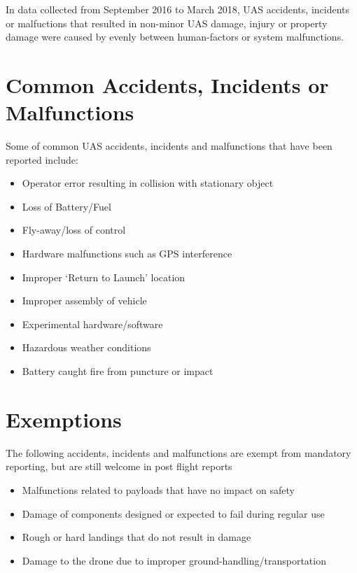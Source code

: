 \documentclass[
]{book}
\providecommand{\tightlist}{%
  \setlength{\itemsep}{0pt}\setlength{\parskip}{0pt}}
\begin{document}
In data collected from September 2016 to March 2018, UAS accidents, incidents or malfuctions that resulted in non-minor UAS damage, injury or property damage were caused by evenly between human-factors or system malfunctions.

\hypertarget{s-common-accidents}{%
\section{Common Accidents, Incidents or Malfunctions}\label{s-common-accidents}}

Some of common UAS accidents, incidents and malfunctions that have been reported include:

\begin{itemize}
\tightlist
\item
  Operator error resulting in collision with stationary object
\item
  Loss of Battery/Fuel
\item
  Fly-away/loss of control
\item
  Hardware malfunctions such as GPS interference
\item
  Improper `Return to Launch' location
\item
  Improper assembly of vehicle
\item
  Experimental hardware/software
\item
  Hazardous weather conditions
\item
  Battery caught fire from puncture or impact
\end{itemize}

\hypertarget{s-reporting-exemptions}{%
\section{Exemptions}\label{s-reporting-exemptions}}

The following accidents, incidents and malfunctions are exempt from mandatory reporting, but are still welcome in post flight reports

\begin{itemize}
\tightlist
\item
  Malfunctions related to payloads that have no impact on safety
\item
  Damage of components designed or expected to fail during regular use
\item
  Rough or hard landings that do not result in damage
\item
  Damage to the drone due to improper ground-handling/transportation
\end{itemize}
\end{document}
